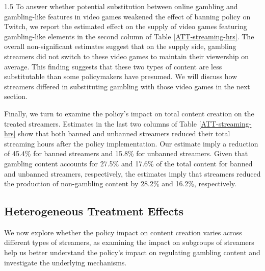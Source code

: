 \documentclass[a4paper,12pt]{article}
\begin{document}
\begin{spacing}{1.5}
To answer whether potential substitution between online gambling and gambling-like features in video games weakened the effect of banning policy on Twitch, we report the estimated effect on the supply of video games featuring gambling-like elements in the second column of Table \ref{ATT-streaming-hrs}. The overall non-significant estimates suggest that on the supply side, gambling streamers did not switch to these video games to maintain their viewership on average. This finding suggests that these two types of content are less substitutable than some policymakers have presumed. We will discuss how streamers differed in substituting gambling with those video games in the next section.

Finally, we turn to examine the policy's impact on total content creation on the treated streamers. Estimates in the last two columns of Table \ref{ATT-streaming-hrs} show that both banned and unbanned streamers reduced their total streaming hours after the policy implementation. Our estimate imply a reduction of 45.4\% for banned streamers and 15.8\% for unbanned streamers. Given that gambling content accounts for 27.5\% and 17.6\%  of the total content for banned and unbanned streamers, respectively, the estimates imply that streamers reduced the production of non-gambling content by 28.2\% and 16.2\%, respectively. 


\subsection{Heterogeneous Treatment Effects}\label{section-supply-side-het-results}

We now explore whether the policy impact on content creation varies across different types of streamers, as examining the impact on subgroups of streamers help us better understand the policy's impact on regulating gambling content and investigate the underlying mechanisms.


\end{spacing}
\end{document}
